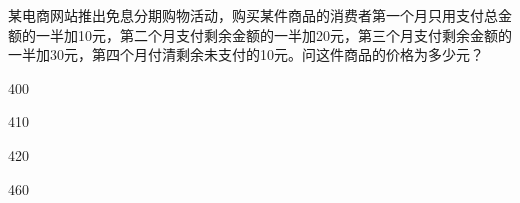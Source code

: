 \documentclass{exam-zh}
\begin{document}
\begin{question}
  某电商网站推出免息分期购物活动，购买某件商品的消费者第一个月只用支付总金额的一半加10元，第二个月支付剩余金额的一半加20元，第三个月支付剩余金额的一半加30元，第四个月付清剩余未支付的10元。问这件商品的价格为多少元？
  \paren

  \begin{choices}
    \item 400
    \item 410
    \item 420
    \item 460
  \end{choices}
\end{question}
\end{document}
